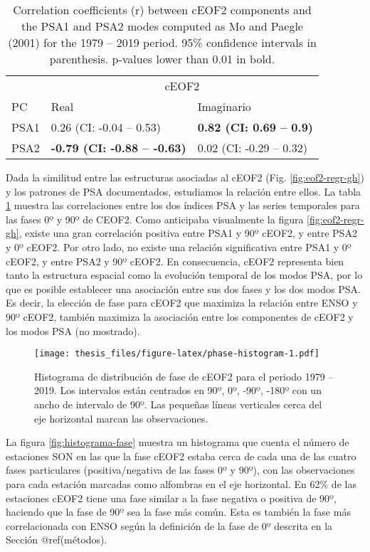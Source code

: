 \documentclass[12pt,oneside]{reedthesis}
\begin{document}
\begin{table}

\caption{\label{tab:psa-eof2}Correlation coefficients (r) between cEOF2 components and the PSA1 and PSA2 modes computed as Mo and Paegle (2001) for the 1979 -- 2019 period. 95\% confidence intervals in parenthesis. p-values lower than 0.01 in bold.}
\centering
\begin{tabular}[t]{l>{}l>{}l}
\toprule
\multicolumn{1}{c}{} & \multicolumn{2}{c}{cEOF2} \\
\cmidrule(l{3pt}r{3pt}){2-3}
PC & Real & Imaginario\\
\midrule
PSA1 & 0.26 (CI: -0.04 -- 0.53) & \textbf{0.82 (CI: 0.69 -- 0.9)}\\
PSA2 & \textbf{-0.79 (CI: -0.88 -- -0.63)} & 0.02 (CI: -0.29 -- 0.32)\\
\bottomrule
\end{tabular}
\end{table}
Dada la similitud entre las estructuras asociadas al cEOF2 (Fig. \ref{fig:eof2-regr-gh}) y los patrones de PSA documentados, estudiamos la relación entre ellos.
La tabla \ref{tab:psa-eof2} muestra las correlaciones entre los dos índices PSA y las series temporales para las fases 0º y 90º de CEOF2.
Como anticipaba visualmente la figura \ref{fig:eof2-regr-gh}, existe una gran correlación positiva entre PSA1 y 90º cEOF2, y entre PSA2 y 0º cEOF2.
Por otro lado, no existe una relación significativa entre PSA1 y 0º cEOF2, y entre PSA2 y 90º cEOF2.
En consecuencia, cEOF2 representa bien tanto la estructura espacial como la evolución temporal de los modos PSA, por lo que es posible establecer una asociación entre sus dos fases y los dos modos PSA.
Es decir, la elección de fase para cEOF2 que maximiza la relación entre ENSO y 90º cEOF2, también maximiza la asociación entre los componentes de cEOF2 y los modos PSA (no mostrado).


\begin{figure}
\centering
\texttt{[image: thesis\_files/figure-latex/phase-histogram-1.pdf]}
\caption{\label{fig:phase-histogram}Histograma de distribución de fase de cEOF2 para el periodo 1979 -- 2019. Los intervalos están centrados en 90º, 0º, -90º, -180º con un ancho de intervalo de 90º. Las pequeñas líneas verticales cerca del eje horizontal marcan las observaciones.}
\end{figure}
La figura \ref{fig:histograma-fase} muestra un histograma que cuenta el número de estaciones SON en las que la fase cEOF2 estaba cerca de cada una de las cuatro fases particulares (positiva/negativa de las fases 0º y 90º), con las observaciones para cada estación marcadas como alfombras en el eje horizontal.
En 62\% de las estaciones cEOF2 tiene una fase similar a la fase negativa o positiva de 90º, haciendo que la fase de 90º sea la fase más común.
Esta es también la fase más correlacionada con ENSO según la definición de la fase de 0º descrita en la Sección @ref(métodos).
\end{document}
